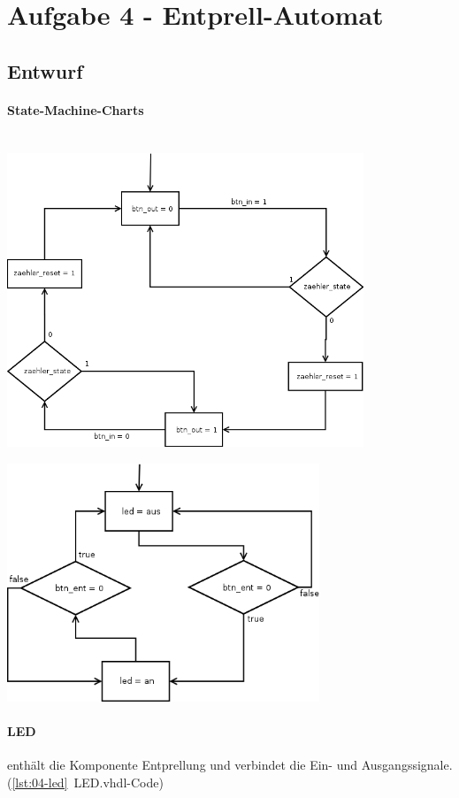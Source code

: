 \section{Aufgabe 4 - Entprell-Automat}
\subsection{Entwurf}
	\paragraph{State-Machine-Charts}\hfill \\

		\includegraphics[width=0.8\textwidth]{resources/04-entpreller.png}
		

		\includegraphics[width=0.7\textwidth]{resources/04-led.png}
		

	\paragraph{LED} enthält die Komponente Entprellung und verbindet die Ein- und Ausgangssignale. (\ref{lst:04-led}~LED.vhdl-Code) 

